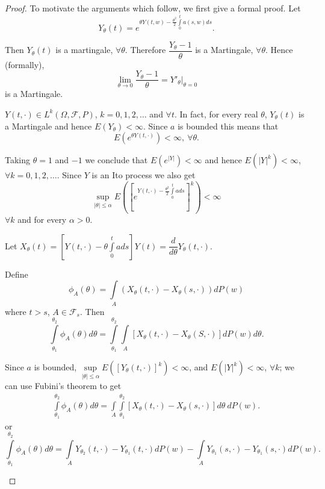 \begin{proof}
To motivate the arguments which follow, we first give a formal proof. Let
$$
Y_{\theta}(t)=e^{\theta Y(t,w)-\frac{\theta^{2}}{2}\int\limits^{t}_{0}a(s,w)ds}.
$$

Then $Y_{\theta}(t)$ is a martingale, $\forall \theta$. Therefore
$\dfrac{Y_{\theta}-1}{\theta}$ is a Martingale, $\forall
\theta$. Hence (formally),
$$
\lim\limits_{\theta\to
  0}\dfrac{Y_{\theta}-1}{\theta}=Y'_{\theta}|_{\theta=0}
$$
is a Martingale.

\setcounter{step}{0}
\begin{step}%
$Y(t,\cdot)\in L^{k}(\Omega,\mathscr{F},P)$, $k=0,1,2,\ldots$ and
  $\forall t$. In fact, for every real $\theta$, $Y_{\theta}(t)$ is a
  Martingale and hence $E(Y_{\theta})<\infty$. Since $a$ is bounded
  this means that
$$
E(e^{\theta Y(t,\cdot)})<\infty,\ \forall \theta.
$$

Taking $\theta=1$ and $-1$ we conclude that $E(e^{|Y|})<\infty$ and
hence $E(|Y|^{k})<\infty$, $\forall k=0,1,2,\ldots$. Since $Y$ is an
Ito process we also get
$$
\sup\limits_{|\theta|\leq
  \alpha}E\left(\left[e^{Y(t,\cdot)-\frac{\theta^{2}}{2}\int\limits^{t}_{0}ads}\right]^{k}\right)<\infty
$$
$\forall k$ and for every $\alpha>0$.
\end{step}

\begin{step}%
Let\pageoriginale
$X_{\theta}(t)=[Y(t,\cdot)-\theta\int\limits^{t}_{0}ads]Y(t)=\dfrac{d}{d\theta}Y_{\theta}(t,\cdot)$. 

Define
$$
\phi_{A}(\theta)=\int\limits_{A}(X_{\theta}(t,\cdot)-X_{\theta}(s,\cdot))dP(w)
$$
where $t>s$, $A\in\mathscr{F}_{s}$. Then
$$
\int\limits^{\theta_{2}}_{\theta_{1}}\phi_{A}(\theta)d\theta=\int\limits^{\theta_{2}}_{\theta_{1}}\int\limits_{A}[X_{\theta}(t,\cdot)-X_{\theta}(S,\cdot)]dP(w)d\theta. 
$$

Since $a$ is bounded, $\sup\limits_{|\theta|\leq
  \alpha}E([Y_{\theta}(t,\cdot)]^{k})<\infty$, and
$E(|Y|^{k})<\infty$, $\forall k$; we can use Fubini's theorem to get
\begin{gather*}
\int\limits^{\theta_{2}}_{\theta_{1}}\phi_{A}(\theta)d\theta=\int\limits_{A}\int\limits^{\theta_{2}}_{\theta_{1}}[X_{\theta}(t,\cdot)-X_{\theta}(s,\cdot)]d\theta\ dP(w). 
\end{gather*}
or
$$
\int\limits^{\theta_{2}}_{\theta_{1}}\phi_{A}(\theta)d\theta=\int\limits_{A}Y_{\theta_{2}}(t,\cdot)-Y_{\theta_{1}}(t,\cdot)dP(w)-\int\limits_{A}Y_{\theta_{1}}(s,\cdot)-Y_{\theta_{1}}(s,\cdot)dP(w). 
$$


\end{step}
\end{proof}
